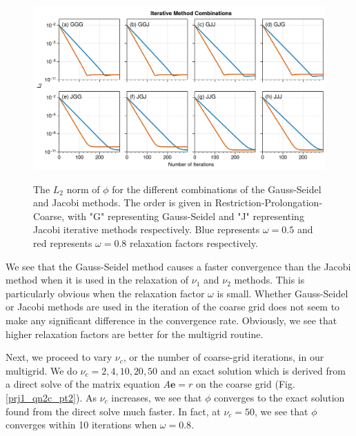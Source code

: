 \begin{enumerate}[label=(\roman*),leftmargin=*,itemsep=0mm]
    \begin{figure}[h!]
    \centering
    \includegraphics[width=\textwidth]{figures/prj1_qn2c_pt1.png}\\
    \caption{The $L_2$ norm of $\phi$ for the different combinations of the Gauss-Seidel and Jacobi methods.  The order is given in Restriction-Prolongation-Coarse, with "G" representing Gauss-Seidel and "J" representing Jacobi iterative methods respectively.  Blue represents $\omega = 0.5$ and red represents $\omega = 0.8$ relaxation factors respectively.}
    \label{prj1_qn2c_pt1}
    \end{figure}
    
    We see that the Gauss-Seidel method causes a faster convergence than the Jacobi method when it is used in the relaxation of $\nu_1$ and $\nu_2$ methods.  This is particularly obvious when the relaxation factor $\omega$ is small.  Whether Gauss-Seidel or Jacobi methods are used in the iteration of the coarse grid does not seem to make any significant difference in the convergence rate.  Obviously, we see that higher relaxation factors are better for the multigrid routine.
    
    Next, we proceed to vary $\nu_c$, or the number of coarse-grid iterations, in our multigrid.  We do $\nu_c = 2,4,10,20,50$ and an exact solution which is derived from a direct solve of the matrix equation $A\mathbf{e}=r$ on the coarse grid (Fig. \ref{prj1_qn2c_pt2}).  As $\nu_c$ increases, we see that $\phi$ converges to the exact solution found from the direct solve much faster.  In fact, at $\nu_c = 50$, we see that $\phi$ converges within 10 iterations when $\omega = 0.8$.


\end{enumerate}
